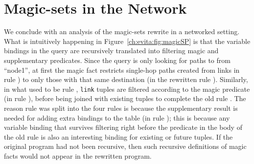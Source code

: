 
\section{Magic-sets in the Network}

We conclude with an analysis of the magic-sets rewrite in a networked setting.
What is intuitively happening in Figure~\ref{ch:evita:fig:magicSP} is that the
variable bindings in the query are recursively translated into filtering magic
and supplementary predicates.  Since the query is only looking for paths to
from ``node1'', at first the magic fact restricts single-hop paths
created from links in rule ) to only those with that same destination
(in the rewritten rule ).  Similarly, in what used to be rule
, {\tt link} tuples are filtered according to the magic predicate (in
rule ), before being joined with existing  tuples to
complete the old rule .  The reason rule  was split into the four
rules is because the supplementary result  is needed for adding
extra bindings to the  table (in rule ); this is
because any variable binding that survives filtering right before the 
predicate in the body of the old rule  is also an interesting binding
for existing or future  tuples.  If the original program had not been
recursive, then such recursive definitions of magic facts would not appear in
the rewritten program.


